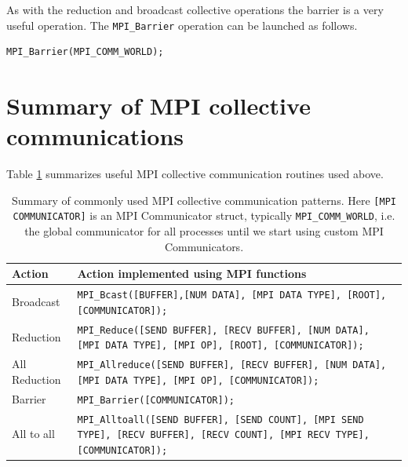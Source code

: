 As with the reduction and broadcast collective operations the barrier is a very useful operation. The \texttt{MPI\_Barrier} operation can be launched as follows.
\begin{verbatim}
MPI_Barrier(MPI_COMM_WORLD);
\end{verbatim}

\section{Summary of MPI collective communications}

Table \ref{mpiCollectivesAPI.tab} summarizes useful MPI collective communication routines used above.

\begin{table}[htbp!]
    \centering
    \begin{tabular}{p{}|p{5in}} \hline
      Action & Action implemented using MPI  functions\\ \hline
    Broadcast &  \texttt{MPI\_Bcast([BUFFER],[NUM DATA], [MPI DATA TYPE], [ROOT], [COMMUNICATOR]);} \\ \hline
    Reduction &\texttt{MPI\_Reduce([SEND BUFFER], [RECV BUFFER], [NUM DATA], [MPI DATA TYPE], [MPI OP], [ROOT], [COMMUNICATOR]);} \\ \hline
    All Reduction &\texttt{MPI\_Allreduce([SEND BUFFER], [RECV BUFFER], [NUM DATA], [MPI DATA TYPE], [MPI OP],  [COMMUNICATOR]);} \\ \hline
    Barrier & \texttt{MPI\_Barrier([COMMUNICATOR]);} \\
    \hline
    All to all & \texttt{MPI\_Alltoall([SEND BUFFER], [SEND COUNT], [MPI SEND TYPE], [RECV BUFFER], [RECV COUNT], [MPI RECV TYPE], [COMMUNICATOR]);} \\ \hline
    \end{tabular}
    \caption{Summary of commonly used MPI collective communication patterns. Here \texttt{[MPI COMMUNICATOR]} is an MPI Communicator struct, typically \texttt{MPI\_COMM\_WORLD}, i.e. the global communicator for all processes until we start using custom MPI Communicators. }    
    \label{mpiCollectivesAPI.tab}
\end{table}

